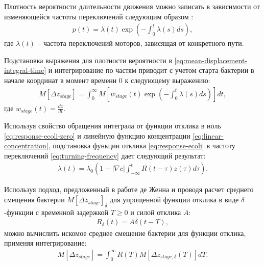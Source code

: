 Плотность вероятности длительности движения можно записать в зависимости от изменяющейся частоты переключений следующим образом \cite{pasupathy_generating_2011}:
\begin{equation}
    \begin{aligned}
        p(t)=\lambda(t) \exp \left ( -\int_0^t \lambda(s) ds \right ),
    \label{eq:duration-prob-exp-integral}
    \end{aligned}
\end{equation}
где $\lambda(t)$ -- частота переключений моторов, зависящая от конкретного пути.

Подстановка выражения для плотности вероятности в \cref{eq:mean-displacement-integral-time} и интегрирование по частям приводит с учетом старта бактерии в начале координат в момент времени 0 к следующему выражению:
\begin{equation}
    \begin{aligned}
        M[\Delta z_{stage}]=\int_0^{\infty} M \left [w_{stage}(t) \exp \left ( -\int_0^t \lambda(s) ds \right ) \right ]dt,
    \label{eq:mean-displacement-on-frequency}
    \end{aligned}
\end{equation}
где $w_{stage}(t)=\frac{dz}{dt}$.

Используя свойство обращения интеграла от функции отклика в ноль \cref{eq:response-ecoli-zero} и линейную функцию концентрации \cref{eq:linear-concentration}, подстановка функции отклика \cref{eq:response-ecoli} в частоту переключений \cref{eq:turning-frequency} дает следующий результат:
\begin{equation}
    \begin{aligned}
        \lambda(t)=\lambda_0 \left ( 1 - |\nabla c| \int_{-\infty}^t R(t-\tau)z(\tau)d\tau \right ).
    \label{eq:frequency-on-response}
    \end{aligned}
\end{equation}

Используя подход, предложенный в работе де Женна \cite{de_gennes_chemotaxis_2004} и проводя расчет среднего смещения бактерии  $M[\Delta z_{stage}]_{\delta}$ для упрощенной функции отклика в виде $\delta$-функции с временной задержкой $T \geq 0$ и силой отклика $A$:
\begin{equation}
    \begin{aligned}
        R_\delta(t) = A \delta(t - T),
    \label{eq:response-delta}
    \end{aligned}
\end{equation}
можно вычислить искомое среднее смещение бактерии для функции отклика, применяя интегрирование:
\begin{equation}
    \begin{aligned}
        M[\Delta z_{stage}]=\int_0^{\infty} R(T) M[\Delta z_{stage,\delta}(T)] dT.
    \label{eq:mean-displacement-on-md-delta}
    \end{aligned}
\end{equation}

